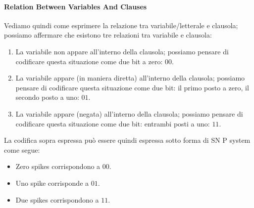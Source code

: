 \documentclass[12pt,a4paper]{report}
\begin{document}
\paragraph{Relation Between Variables And Clauses}
\label{Relation Between Variables And Clauses}
Vediamo quindi come esprimere la relazione tra variabile/letterale e clausola; possiamo affermare che esistono tre relazioni tra variabile e clausola:
\begin{enumerate}
\item La variabile non appare all'interno della clausola; possiamo pensare di codificare questa situazione come due bit a zero: $00$.
\item La variabile appare (in maniera diretta) all'interno della clausola; possiamo pensare di codificare questa situazione come due bit: il primo posto a zero, il secondo posto a uno: $01$.
\item La variabile appare (negata) all'interno della clausola; possiamo pensare di codificare questa situazione come due bit: entrambi posti a uno: $11$.
\end{enumerate}
La codifica sopra espressa può essere quindi espressa sotto forma di SN P system come segue:
\begin{itemize}
\item Zero spikes corrispondono a $00$.
\item Uno spike corrisponde a $01$.
\item Due spikes corrispondono a $11$.
\end{itemize}
\end{document}
